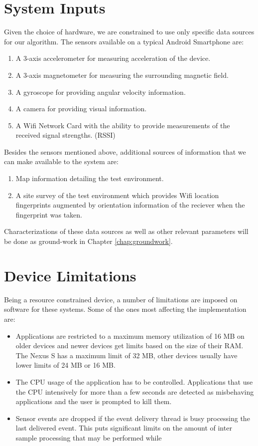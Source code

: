 \section{System Inputs\label{sec:system_inputs}}

Given the choice of hardware, we are constrained to use only specific 
data sources for our algorithm. 
The sensors available on a typical Android Smartphone are:
\begin{enumerate}
\item A 3-axis accelerometer for measuring acceleration of the device.
\item A 3-axis magnetometer for measuring the surrounding magnetic field.
\item A gyroscope for providing angular velocity information.
\item A camera for providing visual information.
\item A Wifi Network Card with the ability to provide measurements of the received signal strengths. (RSSI)
\end{enumerate}

Besides the sensors mentioned above, additional sources of information 
that we can make available to the system are:

\begin{enumerate}
\item Map information detailing the test environment.
\item A site survey of the test environment which provides Wifi location fingerprints augmented by 
    orientation information of the reciever when the fingerprint was taken.
\end{enumerate}

Characterizations of these data sources as well
as other relevant parameters will be done as ground-work in 
Chapter \ref{chap:groundwork}.

\section{Device Limitations\label{sec:device_limitations}}

Being a resource constrained device, a number of limitations are imposed on 
software for these systems. Some of the ones most affecting the implementation
are:

\begin{itemize}
\item Applications are restricted to a maximum memory utilization of 16 MB on 
    older devices and newer devices get limits based on the size of their 
    RAM. The Nexus S has a maximum limit of 32 MB, other devices usually have
    lower limits of 24 MB or 16 MB.
\item The CPU usage of the application has to be controlled. Applications 
    that use the CPU intensively for more than a few seconds are detected as 
    misbehaving applications and the user is prompted to kill them.
\item Sensor events are dropped if the event delivery thread is busy processing
    the last delivered event. This puts significant limits on the 
    amount of inter sample processing that may be performed while 
\end{itemize}

